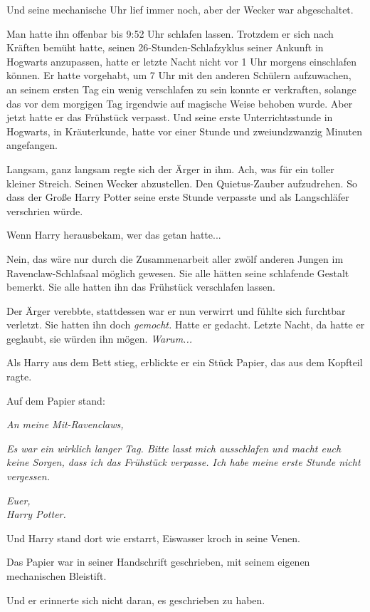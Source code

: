 {Und seine mechanische Uhr lief immer noch, aber der Wecker war abgeschaltet.

Man hatte ihn offenbar bis 9:52 Uhr schlafen lassen. Trotzdem er sich nach Kräften bemüht hatte, seinen 26-Stunden-Schlafzyklus seiner Ankunft in Hogwarts anzupassen, hatte er letzte Nacht nicht vor 1 Uhr morgens einschlafen können. Er hatte vorgehabt, um 7 Uhr mit den anderen Schülern aufzuwachen, an seinem ersten Tag ein wenig verschlafen zu sein konnte er verkraften, solange das vor dem morgigen Tag irgendwie auf magische Weise behoben wurde. Aber jetzt hatte er das Frühstück verpasst. Und seine erste Unterrichtsstunde in Hogwarts, in Kräuterkunde, hatte vor einer Stunde und zweiundzwanzig Minuten angefangen.

Langsam, ganz langsam regte sich der Ärger in ihm. Ach, was für ein toller kleiner Streich. Seinen Wecker abzustellen. Den Quietus-Zauber aufzudrehen. So dass der Große Harry Potter seine erste Stunde verpasste und als Langschläfer verschrien würde.

Wenn Harry herausbekam, wer das getan hatte...

Nein, das wäre nur durch die Zusammenarbeit aller zwölf anderen Jungen im Ravenclaw-Schlafsaal möglich gewesen. Sie alle hätten seine schlafende Gestalt bemerkt. Sie alle hatten ihn das Frühstück verschlafen lassen.

Der Ärger verebbte, stattdessen war er nun verwirrt und fühlte sich furchtbar verletzt. Sie hatten ihn doch \emph{gemocht.} Hatte er gedacht. Letzte Nacht, da hatte er geglaubt, sie würden ihn mögen. \emph{Warum...}

Als Harry aus dem Bett stieg, erblickte er ein Stück Papier, das aus dem Kopfteil ragte.

Auf dem Papier stand:

\emph{An meine Mit-Ravenclaws,}

\emph{Es war ein wirklich langer Tag. Bitte lasst mich ausschlafen und macht euch keine Sorgen, dass ich das Frühstück verpasse. Ich habe meine erste Stunde nicht vergessen.}

\emph{\emph{Euer,\\ Harry Potter.}}

Und Harry stand dort wie erstarrt, Eiswasser kroch in seine Venen.

Das Papier war in seiner Handschrift geschrieben, mit seinem eigenen mechanischen Bleistift.

Und er erinnerte sich nicht daran, es geschrieben zu haben.

}
